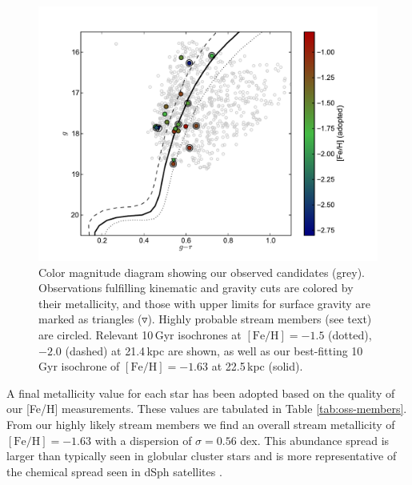 \begin{figure}[t!]
	\includegraphics[width=\columnwidth]{./chapter2/fig4.pdf}
	\caption{Color magnitude diagram showing our observed candidates (grey). Observations fulfilling kinematic and gravity cuts are colored by their metallicity, and those with upper limits for surface gravity are marked as triangles ($\triangledown$). Highly probable stream members (see text) are circled. Relevant 10\,Gyr \citet{Girardi_et-al_2008} isochrones at $[\mbox{Fe/H}] = -1.5$ (dotted), $-2.0$ (dashed) at 21.4\,kpc \citep{Newberg_et-al_2010} are shown, as well as our best-fitting 10\,Gyr isochrone of $[\mbox{Fe/H}] = -1.63$ at 22.5\,kpc (solid).}
	\label{fig:cmd}
\end{figure}

A final metallicity value for each star has been adopted based on the quality of our [Fe/H] measurements. These values are tabulated in Table \ref{tab:oss-members}. From our highly likely stream members we find an overall stream metallicity of $[\mbox{Fe/H}] = -1.63$ with a dispersion of $\sigma = 0.56$ dex. This abundance spread is larger than typically seen in globular cluster stars and is more representative of the chemical spread seen in dSph satellites \citep[e.g.,][]{Frebel_Norris_2011}.



\setlength{\tabcolsep}{2.4pt}

